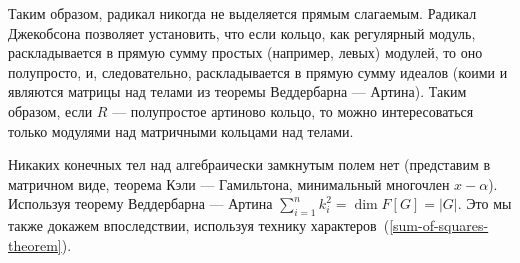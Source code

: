 Таким образом, радикал никогда не выделяется прямым слагаемым.
Радикал Джекобсона позволяет установить, что если кольцо, как регулярный модуль, раскладывается в прямую сумму простых (например, левых) модулей, то оно полупросто, и, следовательно, раскладывается в прямую сумму идеалов (коими и являются матрицы над телами из теоремы Веддербарна --- Артина).
Таким образом, если $R$ --- полупростое артиново кольцо, то можно интересоваться только модулями над матричными кольцами над телами.

Никаких конечных тел над алгебраически замкнутым полем нет (представим в матричном виде, теорема Кэли --- Гамильтона, минимальный многочлен $x - \alpha$).
Используя теорему Веддербарна --- Артина $\sum\limits_{i = 1}^{n}k_i^2 = \dim F[G] = |G|$.
Это мы также докажем впоследствии, используя технику характеров~(\ref{sum-of-squares-theorem}).

